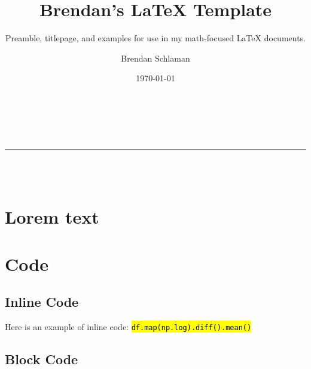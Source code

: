 \documentclass[titlepage]{article}
\title{\bfseries Brendan's {\LaTeX} Template}
\subtitle{
    Preamble, titlepage, and examples for use in my math-focused {\LaTeX} documents.
}
\author{Brendan Schlaman}
\date{\today}
\newcommand{\code}[1]{\texttt{\textcolor{RedViolet}{\hl{\;#1\;}}}}
\begin{document}
\begin{titlepage}
    \centering
    \vspace*{2in}

    {\LARGE \thetitle}\\[2ex]
    {\small \thesubtitle}\\[2ex]
    \rule{\textwidth}{1pt}\\[8ex]
    {\Large \theauthor}\\[2ex]
    {\thedate}
\end{titlepage}

\tableofcontents
\newpage


\section{Lorem text}

\lipsum[1-2]

\section{Code}

\subsection{Inline Code}

Here is an example of inline code:
\code{df.map(np.log).diff().mean()}

\subsection{Block Code}
\end{document}
